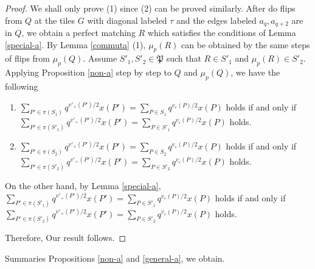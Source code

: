 \documentclass[10pt]{amsart}
\theoremstyle{theorems}
\begin{document}
\begin{proof}

We shall only prove (1) since (2) can be proved similarly. After do flips from $Q$ at the tiles $G$ with diagonal labeled $\tau$ and the edges labeled $a_q,a_{q+2}$ are in $Q$, we obtain a perfect matching $R$ which satisfies the conditions of Lemma \ref{special-a}. By Lemma \ref{commuta} (1), $\mu_p(R)$ can be obtained by the same steps of flips from $\mu_p(Q)$. Assume $S'_1, S'_2\in \mathfrak P$ such that $R\in S'_1$ and $\mu_p(R)\in S'_2$. Applying Proposition \ref{non-a} step by step to $Q$ and $\mu_p(Q)$, we have the following
\begin{enumerate}[$(a)$]

   \item  $\sum_{P'\in \pi(S_1)}q^{v'_{+}(P')/2}x(P')=\sum_{P\in S_1}q^{v_{\varepsilon}(P)/2}x(P)$ holds if and only if\\ $\sum_{P'\in \pi(S'_1)}q^{v'_{+}(P')/2}x(P')=\sum_{P\in S'_1}q^{v_{\varepsilon}(P)/2}x(P)$ holds.

   \item  $\sum_{P'\in \pi(S_2)}q^{v'_{+}(P')/2}x(P')=\sum_{P\in S_2}q^{v_{\varepsilon}(P)/2}x(P)$ holds if and only if\\ $\sum_{P'\in \pi(S'_2)}q^{v'_{+}(P')/2}x(P')=\sum_{P\in S'_2}q^{v_{\varepsilon}(P)/2}x(P)$ holds.

\end{enumerate}
On the other hand, by Lemma \ref{special-a}, $\sum_{P'\in \pi(S'_1)}q^{v'_{+}(P')/2}x(P')=\sum_{P\in S'_1}q^{v_{\varepsilon}(P)/2}x(P)$ holds if and only if $\sum_{P'\in \pi(S'_2)}q^{v'_{+}(P')/2}x(P')=\sum_{P\in S'_2}q^{v_{\varepsilon}(P)/2}x(P)$ holds.

Therefore,
Our result follows.
\end{proof}

\medskip

Summaries Propositions \ref{non-a} and \ref{general-a}, we obtain.

\medskip
\end{document}
